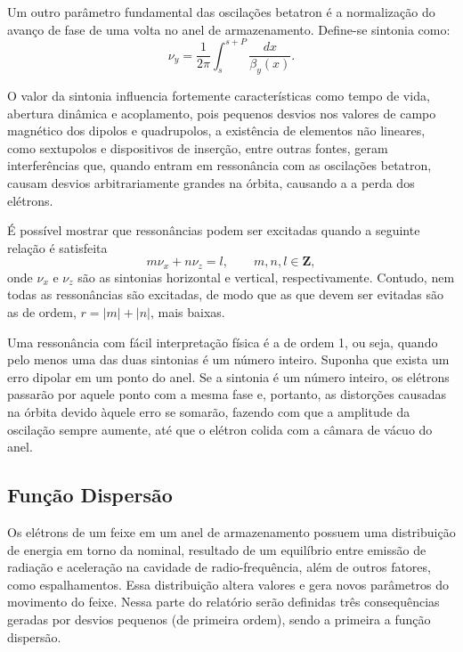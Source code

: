 Um outro parâmetro fundamental das oscilações betatron é a normalização do avanço de fase de uma volta no anel de armazenamento. Define-se sintonia como:
\begin{equation}
 \nu_y = \frac{1}{2 \pi}\int^{s+P}_s \frac{d x}{\beta_y(x)}.
\end{equation}

O valor da sintonia influencia fortemente características como tempo de vida, abertura dinâmica e acoplamento, pois pequenos desvios nos valores de campo magnético dos dipolos e quadrupolos, a existência de elementos não lineares, como sextupolos e dispositivos de inserção, entre outras fontes, geram interferências que, quando entram em ressonância com as oscilações betatron, causam desvios arbitrariamente grandes na órbita, causando a a perda dos elétrons.

É possível mostrar \cite{Lee,Wiedemann3, Huth} que ressonâncias podem ser excitadas quando a seguinte relação é satisfeita
\begin{equation}
 m \nu_x + n \nu_z = l,\qquad m, n, l \in \mathbf{Z},
\end{equation}
onde $\nu_x$ e $\nu_z$ são as sintonias horizontal e vertical, respectivamente. Contudo, nem todas as ressonâncias são excitadas, de modo que as que devem ser evitadas são as de ordem, $r=|m|+|n|$, mais baixas.

Uma ressonância com fácil interpretação física é a de ordem 1, ou seja, quando pelo menos uma das duas sintonias é um número inteiro. Suponha que exista um erro dipolar em um ponto do anel. Se a sintonia é um número inteiro, os elétrons passarão por aquele ponto com a mesma fase e, portanto, as distorções causadas na órbita devido àquele erro se somarão, fazendo com que a amplitude da oscilação sempre aumente, até que o elétron colida com a câmara de vácuo do anel.

\subsection{Função Dispersão}

Os elétrons de um feixe em um anel de armazenamento possuem uma distribuição de energia em torno da nominal, resultado de um equilíbrio entre emissão de radiação e aceleração na cavidade de radio-frequência, além de outros fatores, como espalhamentos. Essa distribuição altera valores e gera novos parâmetros do movimento do feixe. Nessa parte do relatório serão definidas três consequências geradas por desvios pequenos (de primeira ordem), sendo a primeira a função dispersão.

